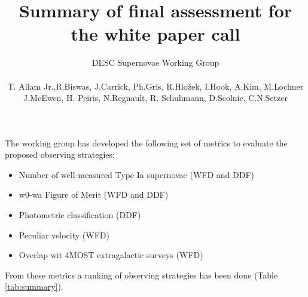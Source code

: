 \documentclass[a4paper,10pt]{article}
\title{Summary of final assessment for the white paper call}
\author{DESC Supernovae Working Group \\ 
\\
T. Allam Jr.,R.Biswas, J.Carrick, Ph.Gris, R.Hlo\v{z}ek, I.Hook, A.Kim, M.Lochner \\ J.McEwen, H. Peiris, N.Regnault, R. Schuhmann, D.Scolnic, C.N.Setzer}
\date{}
\begin{document}
\maketitle

\newpage
\vspace*{10cm}
\newpage

\noindent
The working group has developed the following set of metrics to evaluate the proposed observing strategies:
\begin{itemize}
\item Number of well-measured Type Ia supernovae (WFD and DDF)
\item w0-wa Figure of Merit (WFD and DDF)
\item Photometric classification (DDF)
\item Peculiar velocity (WFD)
\item Overlap wit 4MOST extragalactic surveys (WFD)
\end{itemize}

\noindent
From these metrics a ranking of observing strategies has been done (Table \ref{tab:summary}).
\end{document}
